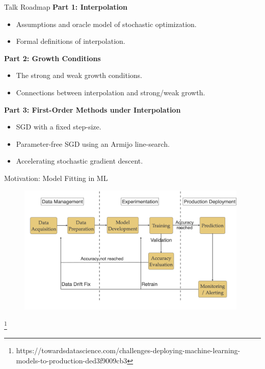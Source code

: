 \documentclass[mathserif,notheorems, hyperref={colorlinks, citecolor=blue, urlcolor=blue, linkcolor=blue}]{beamer}
\newcommand{\source}[1]{{\let\thefootnote\relax\footnote{{\tiny #1}}}}
\begin{document}
    \begin{frame}{Talk Roadmap}
        \textbf{Part 1: Interpolation}
        \begin{itemize}
            \item Assumptions and oracle model of stochastic optimization.
            \item Formal definitions of interpolation.
        \end{itemize}

        \vspace{2ex}
        
        \textbf{Part 2: Growth Conditions}
        \begin{itemize}
            \item The strong and weak growth conditions. 
            \item Connections between interpolation and strong/weak growth.
        \end{itemize}
        
        \vspace{2ex}

        \textbf{Part 3: First-Order Methods under Interpolation}
        \begin{itemize}
            \item SGD with a fixed step-size.
            \item Parameter-free SGD using an Armijo line-search.
            \item Accelerating stochastic gradient descent. 
        \end{itemize}
    \end{frame}

    \begin{frame}{Motivation: Model Fitting in ML}
       
       \begin{figure}
            \centering
            \includegraphics[width=0.98\textwidth]{figures/workflow} 
       \end{figure} 

       \source{https://towardsdatascience.com/challenges-deploying-machine-learning-models-to-production-ded3f9009cb3}
    \end{frame}
\end{document}
